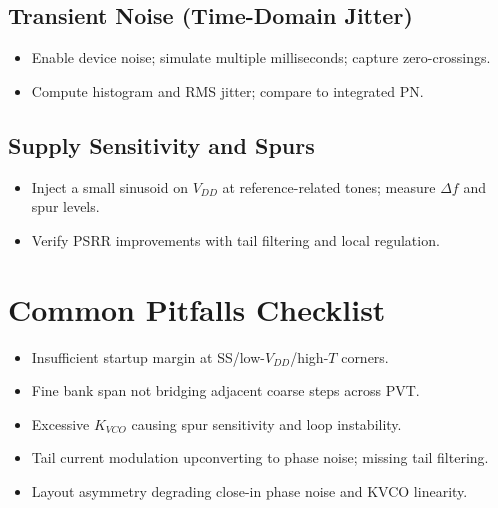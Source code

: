\subsection*{Transient Noise (Time-Domain Jitter)}
\begin{itemize}
  \item Enable device noise; simulate multiple milliseconds; capture zero-crossings.
  \item Compute histogram and RMS jitter; compare to integrated PN.
\end{itemize}

\subsection*{Supply Sensitivity and Spurs}
\begin{itemize}
  \item Inject a small sinusoid on $V_{DD}$ at reference-related tones; measure $\Delta f$ and spur levels.
  \item Verify PSRR improvements with tail filtering and local regulation.
\end{itemize}

\section{Common Pitfalls Checklist}
\begin{itemize}
  \item Insufficient startup margin at SS/low-$V_{DD}$/high-$T$ corners.
  \item Fine bank span not bridging adjacent coarse steps across PVT.
  \item Excessive $K_{VCO}$ causing spur sensitivity and loop instability.
  \item Tail current modulation upconverting to phase noise; missing tail filtering.
  \item Layout asymmetry degrading close-in phase noise and KVCO linearity.
\end{itemize}


